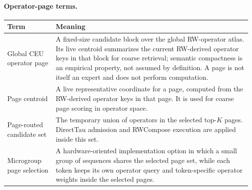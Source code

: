 \documentclass{article}
\begin{document}
\noindent\begin{minipage}{\textwidth}
\paragraph{Operator-page terms.}
\vspace{-0.35em}
\begin{center}
\small
\setlength{\tabcolsep}{5pt}
\renewcommand{\arraystretch}{1.06}
\begin{tabularx}{\textwidth}{lX}
\toprule
\textbf{Term} & \textbf{Meaning} \\
\midrule
Global CEU operator page & A fixed-size candidate block over the global RW-operator atlas. Its live centroid summarizes the current RW-derived operator keys in that block for coarse retrieval; semantic compactness is an empirical property, not assumed by definition. A page is not itself an expert and does not perform computation. \\
Page centroid & A live representative coordinate for a page, computed from the RW-derived operator keys in that page. It is used for coarse page scoring in operator space. \\
Page-routed candidate set & The temporary union of operators in the selected top-$K$ pages. DirectTau admission and RWCompose execution are applied inside this set. \\
Microgroup page selection & A hardware-oriented implementation option in which a small group of sequences shares the selected page set, while each token keeps its own operator query and token-specific operator weights inside the selected pages. \\
\bottomrule
\end{tabularx}
\end{center}
\end{minipage}
\par\medskip
\end{document}
